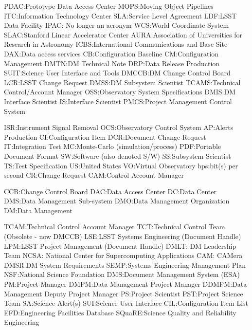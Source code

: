 PDAC:Prototype Data Access Center
MOPS:Moving Object Pipelines
ITC:Information Technology Center
SLA:Service Level Agreement
LDF:LSST Data Facility
IPAC: No longer an acronym
WCS:World Coordinate System
SLAC:Stanford Linear Accelerator Center
AURA:Association of Universities for Research in Astronomy
ICBS:International Communications and Base Site
DAX:Data access services
CB:Configuration Baseline
CM:Configuration Management
DMTN:DM Technical Note
DRP:Data Release Production
SUIT:Science User Interface and Tools
DMCCB:DM Change Control Board
LCR:LSST Change Request
DMSS:DM Subsystem Scientist
TCAMS:Technical Control/Account Manager
OSS:Observatory System Specifications
DMIS:DM Interface Scientist
IS:Interface Scientist
PMCS:Project Management Control System

ISR:Instrument Signal Removal
OCS:Observatory Control System
AP:Alerts Production
CI:Configuration Item
DCR:Document Change Request
IT:Integration Test
MC:Monte-Carlo (simulation/process)
PDF:Portable Document Format
SW:Software (also denoted S/W)
SS:Subsystem Scientist
TS:Test Specification
US:United States
VO:Virtual Observatory
bps:bit(s) per second
CR:Change Request
CAM:Control Account Manager

CCB:Change Control Board
DAC:Data Access Center
DC:Data Center
DMS:Data Management Sub-system
DMO:Data Management Organization
DM:Data Management

TCAM:Technical Control Account Manager
TCT:Technical Control Team (Obsolete - now DMCCB)
LSE:LSST Systems Engineering (Document Handle)
LPM:LSST Project Management (Document Handle)
DMLT: DM Leadership Team
NCSA: National Center for Supercomputing Applications
CAM: CAMera
DMSR:DM System Requirements
SEMP:Systems Engineering Management Plan
NSF:National Science Foundation
DMS:Document Management System (ESA)
PM:Project Manager
DMPM:Data Management Project Manager
DDMPM:Data Management Deputy Project Manager
PS:Project Scientist
PST:Project Science Team
SA:Science Alert(s)
SUI:Science User Interface
CIL:Configuration Item List
EFD:Engineering Facilities Database
SQuaRE:Science Quality and Reliability Engineering
